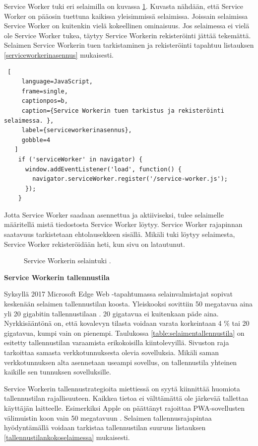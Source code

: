 \documentclass{tktltiki}
\begin{document}
Service Worker tuki eri selaimilla on kuvassa \ref{Service workerin selaintuki}. Kuvasta nähdään, että Service Worker on pääosin tuettuna kaikissa yleisimmissä selaimissa. Joissain selaimissa Service Worker on kuitenkin vielä kokeellinen ominaisuus. Jos selaimessa ei vielä ole Service Worker tukea, täytyy Service Workerin rekisteröinti jättää tekemättä. Selaimen Service Workerin tuen tarkistaminen ja rekisteröinti tapahtuu listauksen \ref{serviceworkerinasennus} mukaisesti.

\begin{lstlisting} [
     language=JavaScript,
     frame=single,
     captionpos=b,
     caption={Service Workerin tuen tarkistus ja rekisteröinti selaimessa. },
     label={serviceworkerinasennus},
     gobble=4
   ]
    if ('serviceWorker' in navigator) {
      window.addEventListener('load', function() {
        navigator.serviceWorker.register('/service-worker.js');
      });
    }
\end{lstlisting}

Jotta Service Worker saadaan asennettua ja aktiiviseksi, tulee selaimelle määritellä mistä tiedostosta Service Worker löytyy. Service Worker rajapinnan saatavuus tarkistetaan ehtolausekkeen sisällä. Mikäli tuki löytyy selaimesta, Service Worker rekisteröidään heti, kun sivu on latautunut. 

\begin{figure}[h]
\begin{center}
\caption{Service Workerin selaintuki \cite{caniuseServiceWorker}. }
\label{Service workerin selaintuki}
\end{center}
\end{figure}


\textbf{Service Workerin tallennustila}

Syksyllä 2017 Microsoft Edge Web -tapahtumassa selainvalmistajat sopivat keskenään selaimen tallennustilan koosta. Yleiskooksi sovittiin 50 megatavua aina yli 20 gigabitin tallennustilaan \cite{Love}. 20 gigatavua ei kuitenkaan päde aina. Nyrkkisääntönä on, että kovalevyn tilasta voidaan varata korkeintaan 4 \% tai 20 gigatavua, kumpi vain on pienempi. Taulukossa \ref{table:selaimentallennustila} on esitetty tallennustilan varaamista erikokoisilla kiintolevyillä. Sivuston raja tarkoittaa samasta verkkotunnuksesta olevia sovelluksia. Mikäli saman verkkotunnuksen alta asennetaan useampi sovellus, on tallennustila yhteinen kaikille sen tunnuksen sovelluksille. 

Service Workerin tallennustrategioita miettiessä on syytä kiinnittää huomiota tallennustilan rajallisuuteen. Kaikkea tietoa ei välttämättä ole järkevää tallettaa käyttäjän laitteelle. Esimerkiksi Apple on päättänyt rajoittaa PWA-sovellusten välimuistin koon vain 50 megatavuun \cite{Love}. Selaimen tallennusrajapintaa hyödyntämällä voidaan tarkistaa tallennustilan suuruus listauksen \ref{tallennustilankokoselaimessa} mukaisesti.
\end{document}
